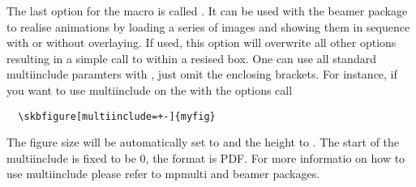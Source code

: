 The last option for the macro \cmd{\skbfigure} is called .
It can be used with the beamer package to realise animations by loading a series of
images and showing them in sequence with or without overlaying. If used, this
option will overwrite all other options resulting in a simple call to
 within a resised box. One can use all standard multiinclude
paramters with \cmd{\skbfigure}, just omit the enclosing brackets. For instance, if you
want to use multiinclude on the  with the options \skbem[code]{<+->} call
\begin{lstlisting}
  \skbfigure[multiinclude=+-]{myfig}
\end{lstlisting}

The figure size will be automatically set to \cmd{\textwidth} and the height to \skbem[code]{!}.
The start of the multiinclude is fixed to be 0, the format is PDF. For more informatio on how to
use multiinclude please refer to mpmulti and beamer packages.